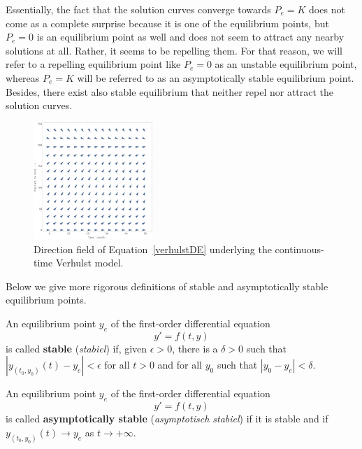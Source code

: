 \begin{example}
Essentially, the fact that the solution curves converge towards $P_e=K$ does not come as a complete surprise because it is one of the equilibrium points, but $P_e=0$ is an equilibrium point as well and does not seem to attract any nearby solutions at all. Rather, it seems to be repelling them. For that reason, we will refer to a repelling equilibrium point like $P_e=0$ as an unstable equilibrium point, whereas $P_e=K$ will be referred to as an asymptotically stable equilibrium point. Besides, there exist also stable equilibrium that neither repel nor attract the solution curves. 

\begin{figure}[H]
	\begin{center}
			\includegraphics[width=0.4\textwidth]{verhulst_DF.pdf}
	\caption{Direction field of Equation~\eqref{verhulstDE} underlying the continuous-time Verhulst model.}
	\label{VerhulstDF}
	\end{center}
\end{figure}


\end{example}

Below we give more rigorous definitions of stable and asymptotically stable equilibrium points. 
\begin{definition} 
\label{stable}
An equilibrium point $y_e$ of the first-order differential equation
$$
y'=f\left(t,y\right)
$$
is called \textbf{stable} (\textit{stabiel}) if, given $\epsilon>0$, there is a $\delta>0$ such that $\left|y_{(t_0,y_0)}(t)-y_e\right|<\epsilon$ for all $t>0$ and for all $y_0$ such that $\left|y_0-y_e\right|<\delta$. 
\end{definition}



\begin{definition} \label{asstable}
An equilibrium point $y_e$ of the first-order differential equation
$$
y'=f\left(t,y\right)
$$
is called \textbf{asymptotically stable} (\textit{asymptotisch stabiel}) if it is stable and if $y_{(t_0,y_0)}(t)\to y_e$ as $t\to+\infty$. 
\end{definition}

